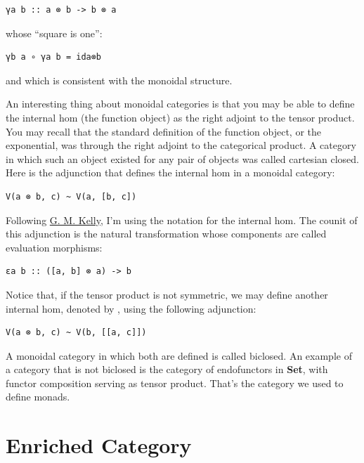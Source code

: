 \begin{verbatim}
γa b :: a ⊗ b -> b ⊗ a
\end{verbatim}

whose ``square is one'':

\begin{verbatim}
γb a ∘ γa b = ida⊗b
\end{verbatim}

and which is consistent with the monoidal structure.

An interesting thing about monoidal categories is that you may be able
to define the internal hom (the function object) as the right adjoint to
the tensor product. You may recall that the standard definition of the
function object, or the exponential, was through the right adjoint to
the categorical product. A category in which such an object existed for
any pair of objects was called cartesian closed. Here is the adjunction
that defines the internal hom in a monoidal category:

\begin{verbatim}
V(a ⊗ b, c) ~ V(a, [b, c])
\end{verbatim}

Following
\href{http://www.tac.mta.ca/tac/reprints/articles/10/tr10.pdf}{G. M.
Kelly}, I'm using the notation \code{{[}b,\ c{]}} for the internal
hom. The counit of this adjunction is the natural transformation whose
components are called evaluation morphisms:

\begin{verbatim}
εa b :: ([a, b] ⊗ a) -> b
\end{verbatim}

Notice that, if the tensor product is not symmetric, we may define
another internal hom, denoted by \code{{[}{[}a,\ c{]}{]}}, using the
following adjunction:

\begin{verbatim}
V(a ⊗ b, c) ~ V(b, [[a, c]])
\end{verbatim}

A monoidal category in which both are defined is called biclosed. An
example of a category that is not biclosed is the category of
endofunctors in \textbf{Set}, with functor composition serving as tensor
product. That's the category we used to define monads.

\section{Enriched Category}\label{enriched-category}


